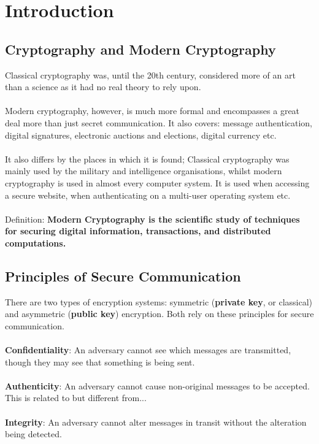 \chapter{Introduction}
\section{Cryptography and Modern Cryptography}
    
    Classical cryptography was, until the 20th century, considered more of an art than a science as it had no real theory to rely upon.\\
    \\
    Modern cryptography, however, is much more formal and encompasses a great deal more than just secret communication. It also covers: message authentication, digital signatures, electronic auctions and elections, digital currency etc.\\
    \\
    It also differs by the places in which it is found; Classical cryptography was mainly used by the military and intelligence organisations, whilst modern cryptography is used in almost every computer system. It is used when accessing a secure website, when authenticating on a multi-user operating system etc.\\
    \\
    Definition: \textbf{Modern Cryptography is the scientific study of techniques for securing digital information, transactions, and distributed computations.}
    
\section{Principles of Secure Communication}
    There are two types of encryption systems: symmetric (\textbf{private key}, or classical) and asymmetric (\textbf{public key}) encryption. Both rely on these principles for secure communication.\\
    \\
    \textbf{Confidentiality}: An adversary cannot see which messages are transmitted, though they may see that something is being sent.\\
    \\
    \textbf{Authenticity}: An adversary cannot cause non-original messages to be accepted. This is related to but different from...\\
    \\
    \textbf{Integrity}: An adversary cannot alter messages in transit without the alteration being detected.\\

